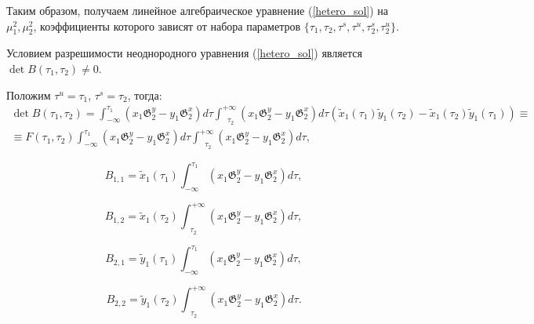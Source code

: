 Таким образом, получаем линейное алгебраическое уравнение (\ref{hetero_sol}) на $\mu_1^2, \mu_2^2$, коэффициенты которого зависят от набора параметров 
$\{ \tau_1, \tau_2, \tau^s, \tau^u, \tau_2^s, \tau_2^u \}$.
 
Условием разрешимости неоднородного уравнения (\ref{hetero_sol}) является $\det B(\tau_1,\tau_2) \neq 0$.

Положим $\tau^u = \tau_1$, $\tau^s = \tau_2$, тогда:
\begin{multline*}
\det B(\tau_1,\tau_2) = 
\int_{-\infty}^{\tau_1} \left( x_1 \mathfrak{G}_2^y - y_1 \mathfrak{G}_2^x \right) d \tau 
\int_{\text{ } \tau_2}^{+\infty} \left( x_1 \mathfrak{G}_2^y - y_1 \mathfrak{G}_2^x \right) d \tau
\left( \tilde x_1(\tau_1) \tilde y_1(\tau_2) - \tilde x_1(\tau_2) \tilde y_1(\tau_1) \right) \equiv \\
\equiv F(\tau_1, \tau_2) \int_{-\infty}^{\tau_1} \left( x_1 \mathfrak{G}_2^y - y_1 \mathfrak{G}_2^x \right) d \tau 
\int_{\text{ } \tau_2}^{+\infty} \left( x_1 \mathfrak{G}_2^y - y_1 \mathfrak{G}_2^x \right) d \tau,
\end{multline*}

$$B_{1,1} = \tilde x_1(\tau_1) \int_{-\infty}^{\tau_1} \left( x_1 \mathfrak{G}_2^y - y_1 \mathfrak{G}_2^x \right) d \tau,$$

$$B_{1,2} = \tilde x_1(\tau_2) \int_{\text{ } \tau_2}^{+\infty} \left( x_1 \mathfrak{G}_2^y - y_1 \mathfrak{G}_2^x \right) d \tau,$$

$$B_{2,1} = \tilde y_1(\tau_1) \int_{-\infty}^{\tau_1} \left( x_1 \mathfrak{G}_2^y - y_1 \mathfrak{G}_2^x \right) d \tau,$$
        
$$B_{2,2} = \tilde y_1(\tau_2) \int_{\text{ } \tau_2}^{+\infty} \left( x_1 \mathfrak{G}_2^y - y_1 \mathfrak{G}_2^x \right) d \tau.$$




